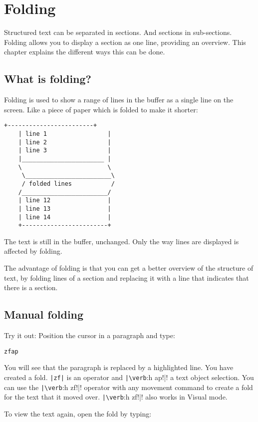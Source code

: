 \section{Folding}
Structured text can be separated in sections.  And sections in sub-sections.
Folding allows you to display a section as one line, providing an overview.
This chapter explains the different ways this can be done.
\subsection{What is folding?}
Folding is used to show a range of lines in the buffer as a single line on the screen.
Like a piece of paper which is folded to make it shorter:

\begin{Verbatim}[samepage=true]
    +------------------------+
    | line 1                 |
    | line 2                 |
    | line 3                 |
    |_______________________ |
    \                        \
     \________________________\
     / folded lines           /
    /________________________/
    | line 12                |
    | line 13                |
    | line 14                |
    +------------------------+
\end{Verbatim}

The text is still in the buffer, unchanged.
Only the way lines are displayed is affected by folding.

The advantage of folding is that you can get a better overview of the structure of text, by folding lines of a section and replacing it with a line that indicates that there is a section.
\subsection{Manual folding}
Try it out: Position the cursor in a paragraph and type:

\begin{Verbatim}[samepage=true]
 zfap
\end{Verbatim}

You will see that the paragraph is replaced by a highlighted line.
You have created a fold.
\verb!|zf|! is an operator and \verb!|\verb!:h ap!|! a text object selection.
You can use the \verb!|\verb!:h zf!|! operator with any movement command to create a fold for the text that it moved over.
\verb!|\verb!:h zf!|! also works in Visual mode.

To view the text again, open the fold by typing:

